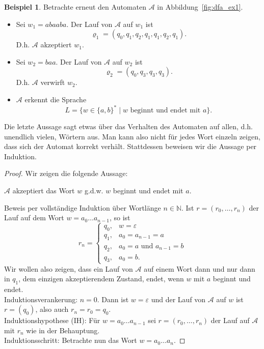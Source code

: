 \documentclass[11pt, a4paper]{article}
\theoremstyle{definition}
\newtheorem{example}[definition]{Beispiel}
\theoremstyle{plain}
\numberwithin{equation}{section}
\begin{document}
\begin{example}\label{exp:dfa_runs}
	Betrachte erneut den Automaten $\mathcal{A}$ in Abbildung~\ref{fig:dfa_ex1}.
	\begin{itemize}
		\item Sei $w_1 = abaaba$. Der Lauf von $\mathcal{A}$ auf $w_1$ ist
			$$
				\varrho_1 = (q_0, q_1, q_2, q_1, q_1, q_2, q_1).
			$$
			D.h. $\mathcal{A}$ akzeptiert $w_1$.
		\item Sei $w_2 = baa$. Der Lauf von $\mathcal{A}$ auf $w_2$ ist
			$$
				\varrho_2 = (q_0, q_3, q_3, q_3).
			$$
			D.h. $\mathcal{A}$ verwirft $w_2$.
		\item $\mathcal{A}$ erkennt die Sprache 
			$$
				L = \{ w \in \{a, b\}^\ast \mid w \text{ beginnt und endet mit } a \}.
			$$
	\end{itemize}
	Die letzte Aussage sagt etwas über das Verhalten des Automaten auf allen, d.h. unendlich vielen, Wörtern aus. Man kann also nicht für jedes Wort einzeln zeigen, dass sich der Automat korrekt verhält. Stattdessen beweisen wir die Aussage per Induktion.
	\begin{proof}
		Wir zeigen die folgende Aussage:
		\begin{center}
			$\mathcal{A}$ akzeptiert das Wort $w$ {g.d.w.} $w$ beginnt und endet mit $a$.
		\end{center}
		Beweis per vollständige Induktion über Wortlänge $n \in \mathbb{N}$. Ist $r = (r_0, \ldots, r_n)$ der Lauf auf dem Wort $w = a_0 \ldots a_{n-1}$, so ist
		$$
			r_n = \left\lbrace 
					\begin{array}{ll}
						q_0, & w = \varepsilon\\
						q_1, & a_0 = a_{n-1} = a\\
						q_2, & a_0 = a \text{ und } a_{n-1} = b\\
						q_3, & a_0 = b.
					\end{array}
				\right.
		$$
		Wir wollen also zeigen, dass ein Lauf von $\mathcal{A}$ auf einem Wort dann und nur dann in $q_1$, dem einzigen akzeptierendem Zustand, endet, wenn $w$ mit $a$ beginnt und endet.\\
		Induktionsverankerung: $n = 0$. Dann ist $w = \varepsilon$ und der Lauf von $\mathcal{A}$ auf $w$ ist $r = (q_0)$, also auch $r_n = r_0 = q_0$.\checkmark\\
		Induktionshypothese (IH): Für $w = a_0 \ldots a_{n-1}$ sei $r = (r_0, \ldots, r_n)$ der Lauf auf $\mathcal{A}$ mit $r_n$ wie in der Behauptung.\\
		Induktionsschritt: Betrachte nun das Wort $w = a_0 \ldots a_n$.

\end{proof}
\end{example}
\end{document}

